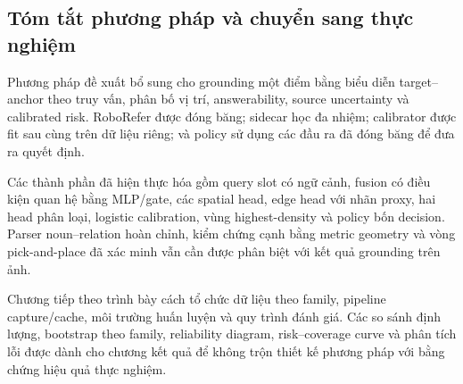 \subsection{Tóm tắt phương pháp và chuyển sang thực nghiệm}

Phương pháp đề xuất bổ sung cho grounding một điểm bằng
biểu diễn target--anchor theo truy vấn, phân bố vị trí,
answerability, source uncertainty và calibrated risk.
RoboRefer được đóng băng; sidecar học đa nhiệm; calibrator
được fit sau cùng trên dữ liệu riêng; và policy sử dụng
các đầu ra đã đóng băng để đưa ra quyết định.

Các thành phần đã hiện thực hóa gồm query slot có ngữ cảnh,
fusion có điều kiện quan hệ bằng MLP/gate, các spatial head,
edge head với nhãn proxy, hai head phân loại, logistic
calibration, vùng highest-density và policy bốn decision.
Parser noun--relation hoàn chỉnh, kiểm chứng cạnh bằng metric
geometry và vòng pick-and-place đã xác minh vẫn cần được
phân biệt với kết quả grounding trên ảnh.

Chương tiếp theo trình bày cách tổ chức dữ liệu theo family,
pipeline capture/cache, môi trường huấn luyện và quy trình
đánh giá. Các so sánh định lượng, bootstrap theo family,
reliability diagram, risk--coverage curve và phân tích lỗi
được dành cho chương kết quả để không trộn thiết kế phương
pháp với bằng chứng hiệu quả thực nghiệm.
